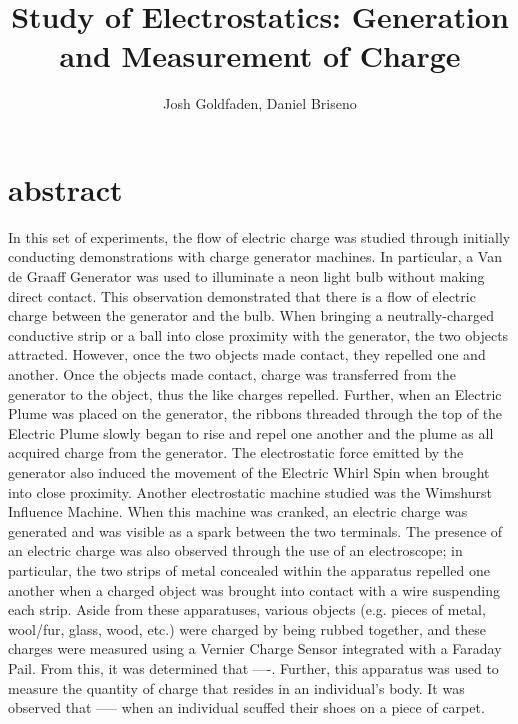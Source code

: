 \documentclass[oneside,12pt]{amsart}
\title{Study of Electrostatics: Generation and Measurement of Charge}
\author{Josh Goldfaden, Daniel Briseno}
\date{}
\begin{document}
\maketitle
\section{abstract}
In this set of experiments, the flow of electric charge was studied through initially conducting demonstrations with charge generator machines. In particular, a Van de Graaff Generator was used to illuminate a neon light bulb without making direct contact. This observation demonstrated that there is a flow of electric charge between the generator and the bulb. When bringing a neutrally-charged conductive strip or a ball into close proximity with the generator, the two objects attracted. However, once the two objects made contact, they repelled one and another. Once the objects made contact, charge was transferred from the generator to the object, thus the like charges repelled. Further, when an Electric Plume was placed on the generator, the ribbons threaded through the top of the Electric Plume slowly began to rise and repel one another and the plume as all acquired charge from the generator. The electrostatic force emitted by the generator also induced the movement of the Electric Whirl Spin when brought into close proximity. Another electrostatic machine studied was the Wimshurst Influence Machine. When this machine was cranked, an electric charge was generated and was visible as a spark between the two terminals. The presence of an electric charge was also observed through the use of an electroscope; in particular, the two strips of metal concealed within the apparatus repelled one another when a charged object was brought into contact with a wire suspending each strip. Aside from these apparatuses, various objects (e.g. pieces of metal, wool/fur, glass, wood, etc.) were charged by being rubbed together, and these charges were measured using a Vernier Charge Sensor integrated with a Faraday Pail. From this, it was determined that ----. Further, this apparatus was used to measure the quantity of charge that resides in an individual’s body. It was observed that ----- when an individual scuffed their shoes on a piece of carpet.
 
\end{document}
